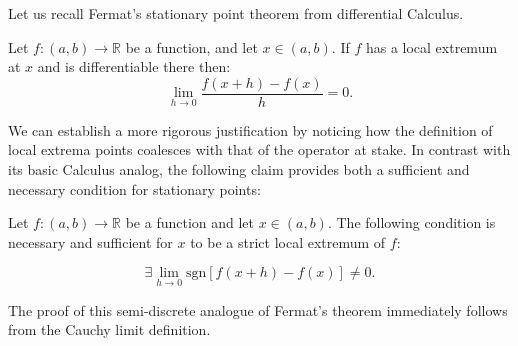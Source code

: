 \documentclass[11pt]{book}
\begin{document}
Let us recall Fermat's stationary point theorem from differential Calculus.

\label{Fermat's Theorem}
\begin{theorem}
Let $f:\left(a,b\right)\rightarrow\mathbb{R}$ be a function, and let $x\in \left(a,b\right).$ If $f$ has a local extremum at $x$ and is differentiable there then:
$$\underset{h\rightarrow0}{\lim}\frac{f\left(x+h\right)-f\left(x\right)}{h}=0.$$
\label{fermat_for_derivative}
\end{theorem}

We can establish a more rigorous justification by noticing how the definition of local extrema points coalesces with that of the operator at stake. In contrast with its basic Calculus analog, the following claim provides both a sufficient and necessary condition for stationary points:

\begin{theorem}Let $f:\left(a,b\right)\rightarrow\mathbb{R}$ be a function and let $x\in \left(a,b\right).$ The following condition is necessary and sufficient for $x$ to be a strict local extremum of $f$:

$$\exists \underset{h\rightarrow0}{\lim}\text{sgn}\left[f\left(x+h\right)-f\left(x\right)\right]\neq0.$$
\label{fermat_semi_discrete}
\end{theorem}

The proof of this semi-discrete analogue of Fermat's theorem immediately follows from the Cauchy limit definition.
\end{document}
